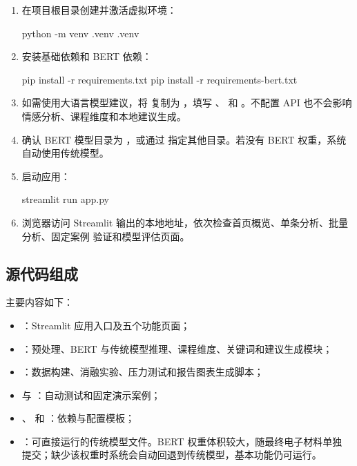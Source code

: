 \begin{enumerate}
  \item 在项目根目录创建并激活虚拟环境：

\begin{commandblock}
python -m venv .venv
.venv\Scripts\activate
\end{commandblock}

  \item 安装基础依赖和 BERT 依赖：

\begin{commandblock}
pip install -r requirements.txt
pip install -r requirements-bert.txt
\end{commandblock}

  \item 如需使用大语言模型建议，将  复制为 ，填写
        、 和 。不配置 API 也不会影响
        情感分析、课程维度和本地建议生成。

  \item 确认 BERT 模型目录为 ，或通过
         指定其他目录。若没有 BERT 权重，系统自动使用传统模型。

  \item 启动应用：

\begin{commandblock}
streamlit run app.py
\end{commandblock}

  \item 浏览器访问 Streamlit 输出的本地地址，依次检查首页概览、单条分析、批量分析、固定案例
        验证和模型评估页面。
\end{enumerate}

\subsection{源代码组成}

主要内容如下：

\begin{itemize}
  \item {}：Streamlit 应用入口及五个功能页面；
  \item {}：预处理、BERT 与传统模型推理、课程维度、关键词和建议生成模块；
  \item {}：数据构建、消融实验、压力测试和报告图表生成脚本；
  \item {} 与 ：自动测试和固定演示案例；
  \item {}、 和
        ：依赖与配置模板；
  \item {}：可直接运行的传统模型文件。BERT 权重体积较大，随最终电子材料单独
        提交；缺少该权重时系统会自动回退到传统模型，基本功能仍可运行。
\end{itemize}

